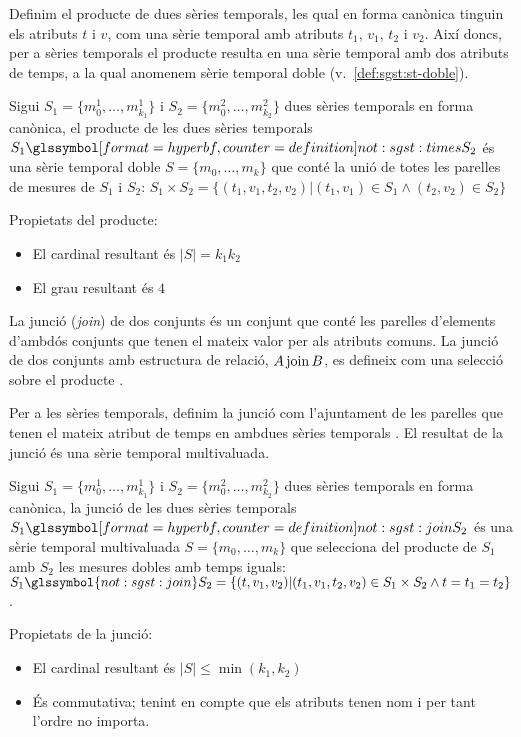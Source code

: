 Definim el producte de dues sèries temporals, les qual en
forma canònica tinguin els atributs $t$ i $v$, com una sèrie temporal
amb atributs $t_1$, $v_1$, $t_2$ i $v_2$. Així doncs, per a sèries
temporals el producte resulta en una sèrie temporal amb dos atributs
de temps, a la qual anomenem sèrie temporal doble (v.\
\autoref{def:sgst:st-doble}).
\begin{definition}[producte]
  Sigui $S_1=\{m_0^1, \dotsc, m_{k_1}^1\}$ i $S_2=\{m_0^2, \dotsc,
  m_{k_2}^2\}$ dues sèries temporals en forma canònica, el producte de
  les dues sèries temporals $S_1 \glssymboldef{not:sgst:times}
  S_2$ és una sèrie temporal doble $S=\{m_0, \dotsc, m_k\}$ que conté
  la unió de totes les parelles de mesures de $S_1$ i $S_2$: $S_1
  \times S_2 = \{ (t_1,v_1,t_2,v_2) | (t_1,v_1) \in S_1 \wedge
  (t_2,v_2) \in S_2 \}$
\end{definition}

Propietats del producte:
\begin{itemize}
\item El cardinal resultant és $|S|=k_1k_2$
\item El grau resultant és $4$
\end{itemize}



La junció (\emph{join}) de dos conjunts és un conjunt que conté les
parelles d'elements d'ambdós conjunts que tenen el mateix valor per
als atributs comuns.  La junció de dos conjunts amb estructura de
relació, $A \operatorname*{join} B$, es defineix com una selecció sobre el
producte \parencite[cap.~7]{date04:introduction8}.


Per a les sèries temporals, definim la junció com l'ajuntament de les
parelles que tenen el mateix atribut de temps en ambdues sèries
temporals . El resultat de la junció és una sèrie temporal
multivaluada.
\begin{definition}[junció]\label{def:sgst:join}
  Sigui $S_1=\{m_0^1, \dotsc, m_{k_1}^1\}$ i $S_2=\{m_0^2, \dotsc,
  m_{k_2}^2\}$ dues sèries temporals en forma canònica, la junció de
  les dues sèries temporals $S_1 \glssymboldef{not:sgst:join} S_2$ és
  una sèrie temporal multivaluada $S=\{m_0, \dotsc, m_k\}$ que
  selecciona del producte de $S_1$ amb $S_2$ les mesures dobles amb
  temps iguals: $S_1 \glssymbol{not:sgst:join} S_2 = \{ (t,v_1,v_2) |
  (t_1,v_1,t_2,v_2) \in S_1\times S_2 \wedge t=t_1=t_2 \}$.
\end{definition}


Propietats de la junció:
\begin{itemize}
\item El cardinal resultant és $|S|\leq\min(k_1,k_2)$
\item És commutativa; tenint en compte que els atributs tenen nom i
  per tant l'ordre no importa.
\end{itemize}




